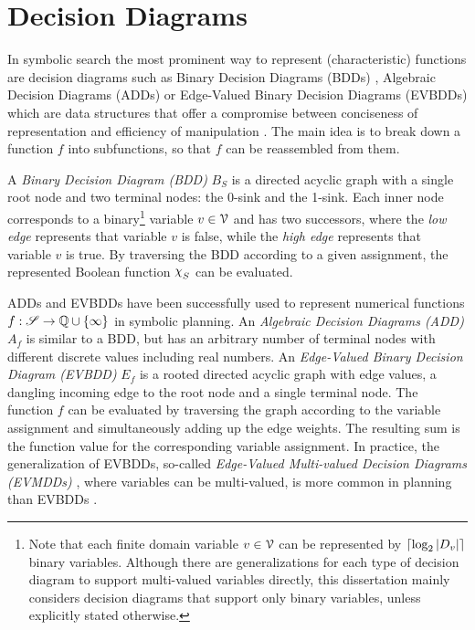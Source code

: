 \section{Decision Diagrams}
In symbolic search the most prominent way to represent (characteristic) functions are decision diagrams such as Binary Decision Diagrams (BDDs) \autocite{bryant-dac1985}, Algebraic Decision
Diagrams (ADDs) \autocite{bahar-et-al-fmsd1997} or Edge-Valued Binary
Decision Diagrams (EVBDDs) \autocite{lai-et-al-ieeetc1996} which are data structures that offer a compromise between conciseness of representation and efficiency of manipulation \autocite{drechsler-becker-1998}. The main idea is to break down a function $f$ into subfunctions, so that $f$ can be reassembled from them.

\begin{definition}\label{def:bdd}
  A \emph{Binary Decision Diagram (BDD)} $B_S$ is a directed acyclic graph with a single root node and two terminal nodes: the 0-sink and the 1-sink. Each inner node corresponds to a binary\footnote{Note that each finite domain variable $v \in \mathcal V$ can be represented by $\lceil \log_2 |D_v| \rceil$ binary variables.
    Although there are generalizations for each type of decision diagram to support multi-valued variables directly, this dissertation mainly considers decision diagrams that support only binary variables, unless explicitly stated otherwise.
  }
  variable $v \in \mathcal V$ and has two successors, where the \emph{low edge} represents that variable $v$ is false, while the \emph{high edge} represents that variable $v$ is true. By traversing the BDD according to a given assignment, the represented Boolean function $\charf_S$ can be evaluated.
\end{definition}

ADDs and EVBDDs have been successfully used to represent numerical functions $f : \mathscr S \to \mathbb{Q} \cup \{\infty\}$ \autocite{hansen-et-al-sara2002,torralba-et-al-ijcai2013,speck-et-al-ipc2018} in symbolic planning. An \emph{Algebraic Decision Diagrams (ADD)} $A_f$ is similar to a BDD, but has an arbitrary number of terminal nodes with different discrete values including real numbers. An \emph{Edge-Valued Binary Decision Diagram (EVBDD)} $E_f$ is a rooted directed acyclic graph with edge values, a dangling incoming edge to the root node and a single terminal node. The function $f$ can be evaluated by traversing the graph according to the variable assignment and simultaneously adding up the edge weights. The resulting sum is the function value for the corresponding variable assignment. In practice, the generalization of EVBDDs, so-called \emph{Edge-Valued Multi-valued Decision Diagrams (EVMDDs)} \autocite{ciardo-siminiceanu-fmcad2002}, where variables can be multi-valued, is more common in planning than EVBDDs \autocite{geisser-et-al-ijcai2015,geisser-et-al-icaps2016,mattmueller-et-al-aaai2018}.

